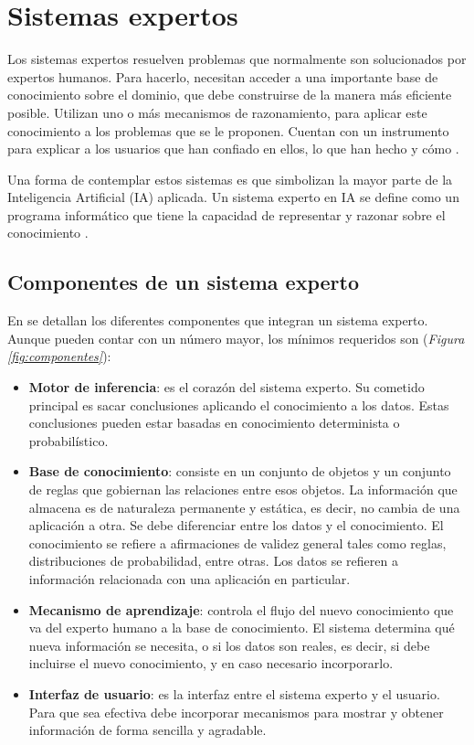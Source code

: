 \section{Sistemas expertos}
Los sistemas expertos resuelven problemas que normalmente son solucionados por expertos humanos. Para hacerlo, necesitan acceder a una importante base de conocimiento sobre el dominio, que debe construirse de la manera más eficiente posible. Utilizan uno o más mecanismos de razonamiento, para aplicar este conocimiento a los problemas que se le proponen. Cuentan con un instrumento para explicar a los usuarios que han confiado en ellos, lo que han hecho y cómo \cite{VonRueden2021}.

Una forma de contemplar estos sistemas es que simbolizan la mayor parte de la Inteligencia Artificial (IA) aplicada. Un sistema experto en IA se define como un programa informático que tiene la capacidad de representar y razonar sobre el conocimiento \cite{Rasheed2021}.

\subsection{Componentes de un sistema experto}
En \cite{Omuya2021} se detallan los diferentes componentes que integran un sistema experto. Aunque pueden contar con un número mayor, los mínimos requeridos son (\textsl{Figura \ref{fig:componentes}}):

\begin{itemize}
\item \textbf{Motor de inferencia}: es el corazón del sistema experto. Su cometido principal es sacar conclusiones aplicando el conocimiento a los datos. Estas conclusiones pueden estar basadas en conocimiento determinista o probabilístico.
\item \textbf{Base de conocimiento}: consiste en un conjunto de objetos y un conjunto de reglas que gobiernan las relaciones entre esos objetos. La información que almacena es de naturaleza permanente y estática, es decir, no cambia de una aplicación a otra. Se debe diferenciar entre los datos y el conocimiento. El conocimiento se refiere a afirmaciones de validez general tales como reglas, distribuciones de probabilidad, entre otras. Los datos se refieren a información relacionada con una aplicación en particular.
\item \textbf{Mecanismo de aprendizaje}: controla el flujo del nuevo conocimiento que va del experto humano a la base de conocimiento. El sistema determina qué nueva información se necesita, o si los datos son reales, es decir, si debe incluirse el nuevo conocimiento, y en caso necesario incorporarlo.
\item \textbf{Interfaz de usuario}: es la interfaz entre el sistema experto y el usuario. Para que sea efectiva debe incorporar mecanismos para mostrar y obtener información de forma sencilla y agradable.
\end{itemize}

